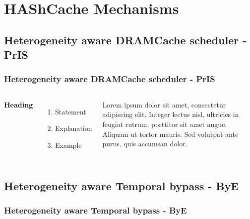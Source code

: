 \documentclass{beamer}
\begin{document}


\section{HAShCache Mechanisms}
\subsection{Heterogeneity aware DRAMCache scheduler - PrIS}


\begin{frame}
\frametitle{Heterogeneity aware DRAMCache scheduler - PrIS}
\begin{columns}[c] %

\textbf{Heading}
\begin{enumerate}
\item Statement
\item Explanation
\item Example
\end{enumerate}

Lorem ipsum dolor sit amet, consectetur adipiscing elit. Integer lectus nisl, ultricies in feugiat rutrum, porttitor sit amet augue. Aliquam ut tortor mauris. Sed volutpat ante purus, quis accumsan dolor.

\end{columns}
\end{frame}


\subsection{Heterogeneity aware Temporal bypass - ByE}
\begin{frame}
\frametitle{Heterogeneity aware Temporal bypass - ByE}

\end{frame}
\end{document}
